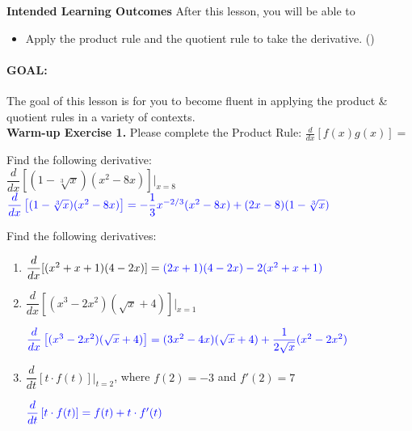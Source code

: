 \documentclass[10pt]{article}
\begin{document}
\pagestyle{otherpages}
\thispagestyle{firstpage}

\textbf{Intended Learning Outcomes}
After this lesson, you will be able to 

\begin{itemize}
    \item Apply the product rule and the quotient rule to take the derivative. ()
\end{itemize}

\vspace{-0.5cm}

\hrulefill

\paragraph*{GOAL:} The goal of this lesson is for you to become fluent in applying the product \& quotient rules in a variety of contexts.\\

{\bf\color{blue}Warm-up Exercise 1.} Please complete the Product Rule: $\displaystyle \frac{d}{dx}[f(x)g(x)]=$   

{} Find the following derivative:\\

$\dfrac{d}{dx}\left[(1-\sqrt[3]{x})(x^2-8x)\right]\bigg|_{x=8}$\\

${\color{blue}\dfrac{d}{dx}\left[(1-\sqrt[3]{x})(x^2-8x)\right]=-\dfrac{1}{3}x^{-2/3}(x^2-8x)+(2x-8)(1-\sqrt[3]{x})}$


\vfill

{} Find the following derivatives:\\

\begin{enumerate}
\item[(a)] $\dfrac{d}{dx}[(x^2+x+1)(4-2x)]={\color{blue}(2x+1)(4-2x)-2(x^2+x+1)}$

\vfill

\item[(b)] $\dfrac{d}{dx}[(x^3-2x^2)(\sqrt{x}+4)]\bigg|_{x=1}$

${\color{blue}\dfrac{d}{dx}\left[(x^3-2x^2)(\sqrt{x}+4)\right]=(3x^2-4x)(\sqrt{x}+4)+\dfrac{1}{2\sqrt{x}}(x^2-2x^2)}$


\vfill
\vfill

\item[(c)] $\dfrac{d}{dt}\left[ t\cdot f(t) \right]\bigg|_{t=2}$, where $f(2)=-3$ and $f'(2)=7$

${\color{blue}\dfrac{d}{dt}\left[ t\cdot f(t) \right]=f(t)+t\cdot f'(t)}$


\vfill
\vfill

\end{enumerate}
\end{document}

